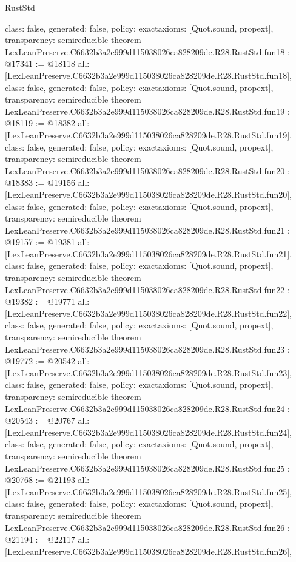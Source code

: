 \begin{lexlean}{RustStd}
\begin{coremodule}
{  class: false,
  generated: false,
  policy: exact{axioms: [Quot.sound, propext]},
  transparency: semireducible
}
theorem LexLeanPreserve.C6632b3a2e999d115038026ca828209de.R28.RustStd.fun18 : @17341 := @18118 {
  all: [LexLeanPreserve.C6632b3a2e999d115038026ca828209de.R28.RustStd.fun18],
  class: false,
  generated: false,
  policy: exact{axioms: [Quot.sound, propext]},
  transparency: semireducible
}
theorem LexLeanPreserve.C6632b3a2e999d115038026ca828209de.R28.RustStd.fun19 : @18119 := @18382 {
  all: [LexLeanPreserve.C6632b3a2e999d115038026ca828209de.R28.RustStd.fun19],
  class: false,
  generated: false,
  policy: exact{axioms: [Quot.sound, propext]},
  transparency: semireducible
}
theorem LexLeanPreserve.C6632b3a2e999d115038026ca828209de.R28.RustStd.fun20 : @18383 := @19156 {
  all: [LexLeanPreserve.C6632b3a2e999d115038026ca828209de.R28.RustStd.fun20],
  class: false,
  generated: false,
  policy: exact{axioms: [Quot.sound, propext]},
  transparency: semireducible
}
theorem LexLeanPreserve.C6632b3a2e999d115038026ca828209de.R28.RustStd.fun21 : @19157 := @19381 {
  all: [LexLeanPreserve.C6632b3a2e999d115038026ca828209de.R28.RustStd.fun21],
  class: false,
  generated: false,
  policy: exact{axioms: [Quot.sound, propext]},
  transparency: semireducible
}
theorem LexLeanPreserve.C6632b3a2e999d115038026ca828209de.R28.RustStd.fun22 : @19382 := @19771 {
  all: [LexLeanPreserve.C6632b3a2e999d115038026ca828209de.R28.RustStd.fun22],
  class: false,
  generated: false,
  policy: exact{axioms: [Quot.sound, propext]},
  transparency: semireducible
}
theorem LexLeanPreserve.C6632b3a2e999d115038026ca828209de.R28.RustStd.fun23 : @19772 := @20542 {
  all: [LexLeanPreserve.C6632b3a2e999d115038026ca828209de.R28.RustStd.fun23],
  class: false,
  generated: false,
  policy: exact{axioms: [Quot.sound, propext]},
  transparency: semireducible
}
theorem LexLeanPreserve.C6632b3a2e999d115038026ca828209de.R28.RustStd.fun24 : @20543 := @20767 {
  all: [LexLeanPreserve.C6632b3a2e999d115038026ca828209de.R28.RustStd.fun24],
  class: false,
  generated: false,
  policy: exact{axioms: [Quot.sound, propext]},
  transparency: semireducible
}
theorem LexLeanPreserve.C6632b3a2e999d115038026ca828209de.R28.RustStd.fun25 : @20768 := @21193 {
  all: [LexLeanPreserve.C6632b3a2e999d115038026ca828209de.R28.RustStd.fun25],
  class: false,
  generated: false,
  policy: exact{axioms: [Quot.sound, propext]},
  transparency: semireducible
}
theorem LexLeanPreserve.C6632b3a2e999d115038026ca828209de.R28.RustStd.fun26 : @21194 := @22117 {
  all: [LexLeanPreserve.C6632b3a2e999d115038026ca828209de.R28.RustStd.fun26],
}
\end{coremodule}
\end{lexlean}
